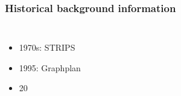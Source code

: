 \documentclass{beamer}
\let\origframetitle=\frametitle
\renewcommand\frametitle[1]{\origframetitle{\textbf{\large{\textrm{#1}}}}}
\begin{document}
\begin{frame}
  \frametitle{Historical background information}

  \begin{columns}

    \begin{itemize}
      \item 1970s: STRIPS
      \item 1995: Graphplan
      \item 20
\end{itemize}
\end{columns}
\end{frame}
\end{document}
